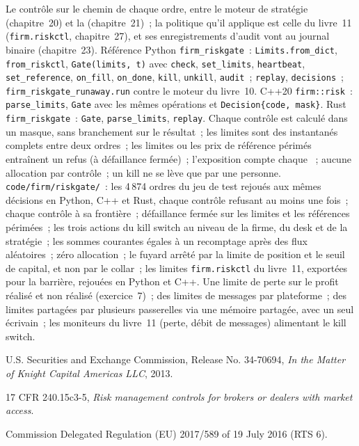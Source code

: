 \begin{build}
 Le contrôle sur le chemin de chaque ordre, entre le moteur de stratégie (chapitre~20) et la 
(chapitre~21)~; la politique qu'il applique est celle du livre~11 (\texttt{firm.riskctl}, chapitre~27), et ses enregistrements d'audit vont au
journal binaire (chapitre~23).
 Référence Python \texttt{firm\_riskgate}~: \texttt{Limits.from\_dict}, \texttt{from\_riskctl},
\texttt{Gate(limits, t)} avec \texttt{check}, \texttt{set\_limits}, \texttt{heartbeat}, \texttt{set\_reference},
\texttt{on\_fill}, \texttt{on\_done}, \texttt{kill}, \texttt{unkill}, \texttt{audit}~; \texttt{replay}, \texttt{decisions}~;
\texttt{firm\_riskgate\_runaway.run} contre le moteur du livre~10. C++20 \texttt{firm::risk}~: \texttt{parse\_limits},
\texttt{Gate} avec les mêmes opérations et \texttt{Decision\{code, mask\}}. Rust \texttt{firm\_riskgate}~: \texttt{Gate},
\texttt{parse\_limits}, \texttt{replay}.
 Chaque contrôle est calculé dans un masque, sans branchement sur le résultat~; les limites sont des instantanés complets entre deux ordres~; les limites
ou les prix de référence périmés entraînent un refus (à défaillance fermée)~; l'exposition compte chaque ~; aucune allocation par contrôle~; un kill ne se lève
que par une personne.
 \texttt{code/firm/riskgate/}~: les 4\,874 ordres du jeu de test rejoués aux mêmes décisions en Python, C++
et Rust, chaque contrôle refusant au moins une fois~; chaque contrôle à sa frontière~; défaillance fermée sur les limites et les références périmées~; les trois
actions du kill switch au niveau de la firme, du desk et de la stratégie~; les sommes courantes égales à un recomptage après des flux aléatoires~; zéro
allocation~; le fuyard arrêté par la limite de position et le seuil de capital, et non par le collar~; les limites \texttt{firm.riskctl} du livre~11,
exportées pour la barrière, rejouées en Python et C++.
 Une limite de perte sur le profit réalisé et non réalisé (exercice~7)~; des limites de messages par plateforme~; des limites partagées
par plusieurs passerelles via une mémoire partagée, avec un seul écrivain~; les moniteurs du livre~11 (perte, débit de messages) alimentant le kill switch.
\end{build}

\begin{omsources}
\item U.S. Securities and Exchange Commission, Release No. 34-70694, \emph{In the Matter of Knight Capital Americas LLC}, 2013.
\item 17 CFR 240.15c3-5, \emph{Risk management controls for brokers or dealers with market access}.
\item Commission Delegated Regulation (EU) 2017/589 of 19 July 2016 (RTS 6).
\end{omsources}


